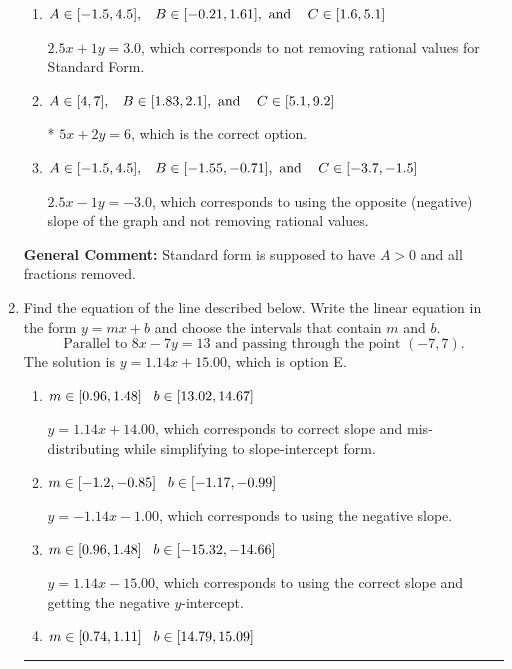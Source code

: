 \documentclass{extbook}[14pt]
\newcommand{\litem}[1]{\item #1

\rule{\textwidth}{0.4pt}}
\begin{document}
\begin{enumerate}
{\begin{enumerate}[label=\Alph*.]
 $-5x - 2y = -6$, which corresponds to not making $A$ positive (by multiplying the equation by $-1$).
\item \( A \in [-1.5, 4.5], \hspace{3mm} B \in [-0.21, 1.61], \text{ and } \hspace{3mm} C \in [1.6, 5.1] \)

 $2.5x + 1y = 3.0$, which corresponds to not removing rational values for Standard Form.
\item \( A \in [4, 7], \hspace{3mm} B \in [1.83, 2.1], \text{ and } \hspace{3mm} C \in [5.1, 9.2] \)

* $5x + 2y = 6$, which is the correct option.
\item \( A \in [-1.5, 4.5], \hspace{3mm} B \in [-1.55, -0.71], \text{ and } \hspace{3mm} C \in [-3.7, -1.5] \)

 $2.5x - 1y = -3.0$, which corresponds to using the opposite (negative) slope of the graph and not removing rational values.
\end{enumerate}

\textbf{General Comment:} Standard form is supposed to have $A > 0$ and all fractions removed.
}
\litem{
Find the equation of the line described below. Write the linear equation in the form $ y=mx+b $ and choose the intervals that contain $m$ and $b$.
\[ \text{Parallel to } 8 x - 7 y = 13 \text{ and passing through the point } (-7, 7). \]The solution is \( y = 1.14x + 15.00 \), which is option E.\begin{enumerate}[label=\Alph*.]
\item \( m \in [0.96, 1.48] \hspace*{3mm} b \in [13.02, 14.67] \)

 $y = 1.14x + 14.00$, which corresponds to correct slope and mis-distributing while simplifying to slope-intercept form.
\item \( m \in [-1.2, -0.85] \hspace*{3mm} b \in [-1.17, -0.99] \)

 $y = -1.14x - 1.00$, which corresponds to using the negative slope.
\item \( m \in [0.96, 1.48] \hspace*{3mm} b \in [-15.32, -14.66] \)

 $y = 1.14x - 15.00$, which corresponds to using the correct slope and getting the negative $y$-intercept.
\item \( m \in [0.74, 1.11] \hspace*{3mm} b \in [14.79, 15.09] \)


\end{enumerate}}
\end{enumerate}
\end{document}
